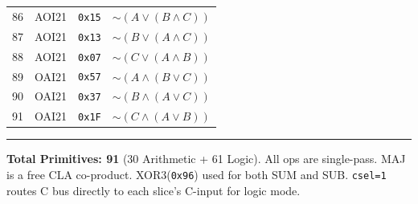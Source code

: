 \documentclass[10pt,landscape,a4paper]{article}
\begin{document}
\begin{minipage}[t]{0.25\textwidth}
\begin{tabular}{@{}rlcl@{}}
    86 & AOI21 & \texttt{0x15} & $\sim(A \vee (B \wedge C))$ \\
    87 & AOI21 & \texttt{0x13} & $\sim(B \vee (A \wedge C))$ \\
    88 & AOI21 & \texttt{0x07} & $\sim(C \vee (A \wedge B))$ \\
    89 & OAI21 & \texttt{0x57} & $\sim(A \wedge (B \vee C))$ \\
    90 & OAI21 & \texttt{0x37} & $\sim(B \wedge (A \vee C))$ \\
    91 & OAI21 & \texttt{0x1F} & $\sim(C \wedge (A \vee B))$ \\
    \bottomrule
    \end{tabular}
\end{minipage}

\vfill
\hrule
\vspace{0.3em}
{\scriptsize \textbf{Total Primitives: 91} (30 Arithmetic + 61 Logic). All ops are single-pass. MAJ is a free CLA co-product. XOR3(\texttt{0x96}) used for both SUM and SUB. \texttt{csel=1} routes C bus directly to each slice's C-input for logic mode.}
\end{document}
